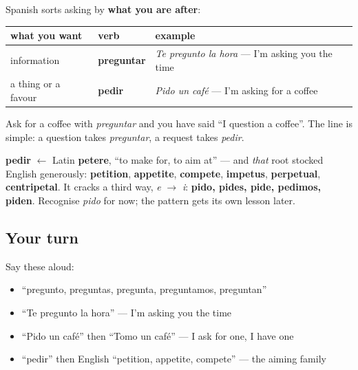 \begin{grammarlens}[title={Grammar Lens: one English \textquotedblleft{}ask\textquotedblright{}, two Spanish verbs}]
Spanish sorts asking by \textbf{what you are after}:

\noindent
\begin{tabularx}{\linewidth}{@{}>{\raggedright\arraybackslash}X>{\raggedright\arraybackslash}X>{\raggedright\arraybackslash}X@{}}
\toprule
\textbf{what you want} & \textbf{verb} & \textbf{example} \\
\midrule
information & \textbf{preguntar} & \emph{Te pregunto la hora} — I'm asking you the time \\
a thing or a favour & \textbf{pedir} & \emph{Pido un café} — I'm asking for a coffee \\
\bottomrule
\end{tabularx}

Ask for a coffee with \emph{preguntar} and you have said \textquotedblleft{}I question a coffee\textquotedblright{}. The line is simple: a question takes \emph{preguntar}, a request takes \emph{pedir}.

\textbf{pedir} $\leftarrow$ Latin \textbf{petere}, \textquotedblleft{}to make for, to aim at\textquotedblright{} — and \emph{that} root stocked English generously: \textbf{petition}, \textbf{appetite}, \textbf{compete}, \textbf{impetus}, \textbf{perpetual}, \textbf{centripetal}. It cracks a third way, \emph{e} $\to$ \emph{i}: \textbf{pido, pides, pide, pedimos, piden}. Recognise \emph{pido} for now; the pattern gets its own lesson later.
\end{grammarlens}

\subsection*{Your turn}
Say these aloud:

\begin{itemize}
\raggedright
  \item \textquotedblleft{}pregunto, preguntas, pregunta, preguntamos, preguntan\textquotedblright{}
  \item \textquotedblleft{}Te pregunto la hora\textquotedblright{} — I'm asking you the time
  \item \textquotedblleft{}Pido un café\textquotedblright{} then \textquotedblleft{}Tomo un café\textquotedblright{} — I ask for one, I have one
  \item \textquotedblleft{}pedir\textquotedblright{} then English \textquotedblleft{}petition, appetite, compete\textquotedblright{} — the aiming family
\end{itemize}

